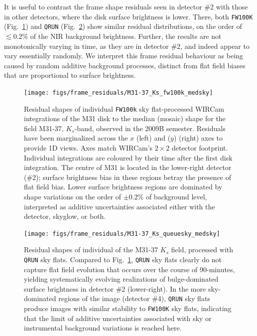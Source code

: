 \documentclass[iop]{emulateapj}
\newcommand{\mycomment}[1]{\textcolor{OliveGreen}{\textit{#1}}} %
\newcommand{\Fig}[1]{Fig.~\ref{fig:#1}}  %
\begin{document}
It is useful to contrast the frame shape residuals seen in detector \#2 with those in other detectors, where the disk surface brightness is lower.
There, both \texttt{FW100K} (\Fig{frame_residuals_M31-37_Ks_fw100k_medsky}) and \texttt{QRUN} (\Fig{frame_residuals_M31-37_Ks_QRUN}) show similar residual distributions, on the order of $\lesssim 0.2$\% of the NIR background brightness.
Further, the results are not monotonically varying in time, as they are in detector \#2, and indeed appear to vary essentially randomly.
We interpret this frame residual behaviour as being caused by random additive background processes, distinct from flat field biases that are proportional to surface brightness.


\begin{figure}[p]
\centering
\texttt{[image: figs/frame\_residuals/M31-37\_Ks\_fw100k\_medsky]}
\caption{Residual shapes of individual \texttt{FW100k} sky flat-processed WIRCam integrations of the M31 disk to the median (mosaic) shape for the field M31-37, $K_s$-band, observed in the 2009B semester.
Residuals have been marginalized across the $x$ (left) and ($y$) (right) axes to provide 1D views.
Axes match WIRCam's $2\times2$ detector footprint.
Individual integrations are coloured by their time after the first disk integration.
The centre of M31 is located in the lower-right detector (\#2); surface brightness bias in these regions betray the presence of flat field bias. Lower surface brightness regions are dominated by shape variations on the order of $\pm 0.2\%$ of background level, interpreted as additive uncertainties associated either with the detector, skyglow, or both.}
\label{fig:frame_residuals_M31-37_Ks_fw100k_medsky}
\end{figure}


\begin{figure}[p]
\centering
\texttt{[image: figs/frame\_residuals/M31-37\_Ks\_queuesky\_medsky]}
\caption{Residual shapes of individual of the M31-37 $K_s$ field, processed with \texttt{QRUN} sky flats.
Compared to \Fig{frame_residuals_M31-37_Ks_fw100k_medsky}, \texttt{QRUN} sky flats clearly do not capture flat field evolution that occurs over the course of 90-minutes, yielding systematically evolving realizations of bulge-dominated surface brightness in detector \#2 (lower-right). In the more sky-dominated regions of the image (detector \#4), \texttt{QRUN} sky flats produce images with similar stability to \texttt{FW100K} sky flats, indicating that the limit of additive uncertainties associated with sky or instrumental background variations is reached here.}
\label{fig:frame_residuals_M31-37_Ks_QRUN}
\end{figure}
\end{document}
